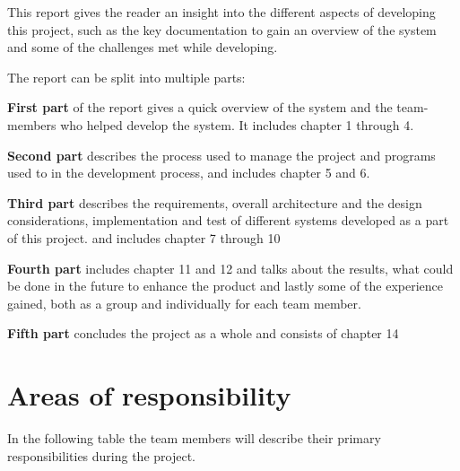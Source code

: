 This report gives the reader an insight into the different aspects of developing this project, such as the key documentation to gain an overview of the system and some of the challenges met while developing.

The report can be split into multiple parts:

\textbf{First part} of the report gives a quick overview of the system and the team-members who helped develop the system. It includes chapter 1 through 4.

\textbf{Second part} describes the process used to manage the project and programs used to in the development process, and includes chapter 5 and 6.

\textbf{Third part} describes the requirements, overall architecture and the design considerations, implementation and test of different systems developed as a part of this project.  and includes chapter 7 through 10

\textbf{Fourth part} includes chapter 11 and 12 and talks about the results, what could be done in the future to enhance the product and lastly some of the experience gained, both as a group and individually for each team member.

\textbf{Fifth part} concludes the project as a whole and consists of chapter 14

\clearpage
\section{Areas of responsibility}
In the following table the team members will describe their primary responsibilities during the project. 

